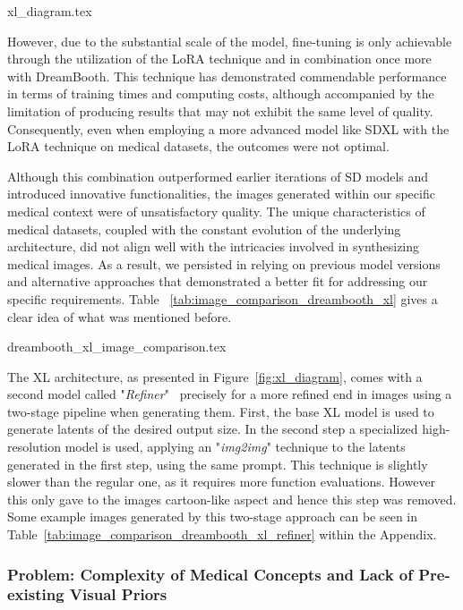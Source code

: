 {xl_diagram.tex}  

However, due to the substantial scale of the model, fine-tuning is only achievable through the utilization of the LoRA technique and in combination once more with DreamBooth. This technique has demonstrated commendable performance in terms of training times and computing costs, although accompanied by the limitation of producing results that may not exhibit the same level of quality. Consequently, even when employing a more advanced model like SDXL with the LoRA technique on medical datasets, the outcomes were not optimal.

Although this combination outperformed earlier iterations of SD models and introduced innovative functionalities, the images generated within our specific medical context were of unsatisfactory quality. The unique characteristics of medical datasets, coupled with the constant evolution of the underlying architecture, did not align well with the intricacies involved in synthesizing medical images. As a result, we persisted in relying on previous model versions and alternative approaches that demonstrated a better fit for addressing our specific requirements. Table ~\ref{tab:image_comparison_dreambooth_xl} gives a clear idea of what was mentioned before. 

{dreambooth_xl_image_comparison.tex}

The XL architecture, as presented in Figure~\ref{fig:xl_diagram}, comes with a second model called "\textit{Refiner}"~\cite{StabilityAIstablediffusionXLRefinerHugging} precisely for a more refined end in images using a two-stage pipeline when generating them. First, the base XL model is used to generate latents of the desired output size. In the second step a specialized high-resolution model is used, applying an "\textit{img2img}" technique to the latents generated in the first step, using the same prompt. This technique is slightly slower than the regular one, as it requires more function evaluations. However this only gave to the images cartoon-like aspect and hence this step was removed. Some example images generated by this two-stage approach can be seen in Table~\ref{tab:image_comparison_dreambooth_xl_refiner} within the Appendix. 

\subsubsection{Problem: Complexity of Medical Concepts and Lack of Pre-existing Visual Priors}

